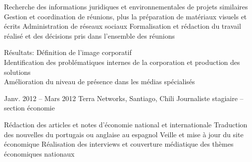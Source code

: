 \documentclass[30pt, french]{tccv}
\begin{document}
\begin{upshape}
\begin{textblock}{13}
\begin{mdframed}
\begin{eventlist}
\setlength{\parskip}{-10pt}
\begin{itemize}
      \setlength\itemsep{-3pt} 
      \cvitem[\checkmark] Recherche des informations juridiques et environnementales de projets similaires          
      \cvitem[\checkmark] Gestion et coordination de réunions, plus la préparation de matériaux visuels et écrits   
      \cvitem[\checkmark] Administration de réseaux sociaux                                                                    
      \cvitem[\checkmark] Formalisation et rédaction du travail réalisé et des décisions pris dans l’ensemble des réunions     
\end{itemize}      

Résultats: Définition de l’image corporatif \\
Identification des problématiques internes de la corporation et production des solutions \\
Amélioration du niveau de présence dans les médias spécialisés \\


  
\setlength{\parskip}{0pt}
\item{Janv. 2012 -- Mars 2012 }     
  {Terra Networks, Santiago, Chili}     
  {Journaliste stagiaire – section économie}
  \fontsize{9pt}{1em}\color{text}\bodyfontlight\upshape\selectfont

  
\setlength{\parskip}{-10pt}
\begin{itemize}
      \setlength\itemsep{0cm} 
      \cvitem[\checkmark] Rédaction des articles et notes d’économie national et internationale
      \cvitem[\checkmark] Traduction des nouvelles du portugais ou anglaise au espagnol
      \cvitem[\checkmark] Veille et mise à jour du site économique
      \cvitem[\checkmark] Réalisation des interviews et couverture médiatique des thèmes économiques nationaux

\end{itemize}        



   


\end{eventlist}


\end{mdframed}
\end{textblock}

\end{upshape}
\end{document}
